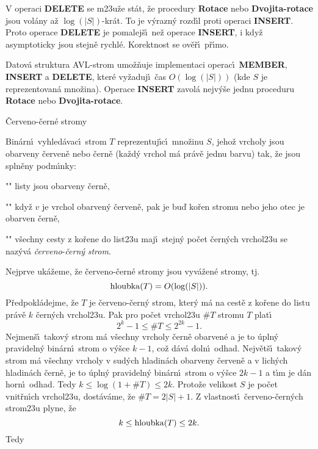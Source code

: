 \flushpar V operaci {\bf DELETE} se m\accent23u\v ze st\'at, \v ze procedury 
{\bf Rotace} nebo {\bf Dvojita-rotace} jsou vol\'any a\v z $\log(
|S|)$-kr\'at. 
To je v\'yrazn\'y rozd\'\i l proti operaci {\bf INSERT}. Proto operace 
{\bf DELETE} je pomalej\v s\'\i\ ne\v z operace {\bf INSERT}, i kdy\v z 
asymptoticky jsou stejn\v e rychl\'e. Korektnost se 
ov\v e\v r\'\i\ p\v r\'\i mo.

Datov\'a struktura AVL-strom 
umo\v z\v nuje implementaci operac\'\i\ {\bf MEMBER}, {\bf INSERT} a 
{\bf DELETE}, kter\'e vy\v zaduj\'\i\ \v cas $O(\log(|S|))$ (kde $
S$ je 
reprezentovan\'a mno\v zina).  Ope\-race {\bf INSERT} zavol\'a 
nejv\'y\v se jednu proceduru {\bf Rotace} nebo {\bf Dvo\-ji\-ta-rotace}.  
\endproclaim
\medskip

\heading 
\v Cerveno-\v cern\'e stromy
\endheading

\flushpar Bin\'arn\'\i\ vyhled\'avac\'\i\ strom $T$ reprezentuj\'\i c\'\i\ 
mno\v zinu $S$, jeho\v z vrcholy jsou obarveny \v cerven\v e nebo 
\v cern\v e (ka\v zd\'y vrchol m\'a pr\'av\v e jednu barvu) tak, \v ze jsou 
spln\v eny podm\'\i nky:
\roster
\item"{}"
listy jsou obarveny \v cern\v e,
\item"{}"
kdy\v z $v$ je vrchol obarven\'y \v cerven\v e, pak je bu\v d ko\v ren 
stromu nebo jeho otec je obarven \v cern\v e,
\item"{}"
v\v sechny cesty z ko\v rene do list\accent23u maj\'\i\ stejn\'y 
po\v cet \v cer\-n\'ych vrchol\accent23u
\endroster
se naz\'yv\'a \emph{\v cerveno}-\emph{\v cern\'y} \emph{strom}. 
\medskip

\flushpar Nejprve uk\'a\v zeme, \v ze \v cerveno-\v cern\'e stromy jsou 
vyv\'a\v zen\'e stro\-my, tj. $$\operatorname{hloubka}(T)=O(\log(|S|)).$$
P\v redpokl\'adejme, \v ze $T$ je \v cerveno-\v cern\'y strom, kter\'y m\'a 
na cest\v e z ko\v rene do listu pr\'av\v e $k$ \v cern\'ych 
vrchol\accent23u. Pak pro po\v cet vrchol\accent23u $\#T$ 
stromu $T$ plat\'\i\ 
$$2^k-1\le \#T\le 2^{2k}-1.$$
Nejmen\v s\'\i\ takov\'y strom m\'a v\v sechny vrcholy \v cern\v e 
obarven\'e a je to \'upln\'y pravideln\'y bin\'arn\'\i\ strom o 
v\'y\v sce $k-1$, co\v z d\'av\'a doln\'\i\ odhad.  Nejv\v et\v s\'\i\ takov\'y 
strom m\'a v\v sechny vrcholy v sud\'ych hladin\'ach obarveny 
\v cerven\v e a v lich\'ych hladin\'ach \v cern\v e, je to \'upln\'y 
pravideln\'y bin\'arn\'\i\ strom o v\'y\v sce $2k-1$ a t\'\i m je d\'an 
horn\'\i\ odhad. Tedy $k\le\log(1+\#T)\le 2k$.
Proto\v ze velikost $S$ je po\v cet vnit\v rn\'\i ch vrchol\accent23u, 
dost\'av\'ame, \v ze $\#T=2|S|+1$. Z vlastnost\'\i\ \v cerveno-\v cern\'ych 
strom\accent23u plyne, \v ze 
$$k\le\operatorname{hloubka}(T)\le 2k.$$
Tedy
\medskip

